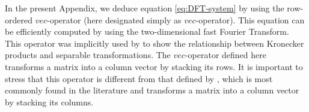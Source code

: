 \documentclass[manuscript,revised]{geophysics}
\begin{document}
%




In the present Appendix, we deduce equation \ref{eq:DFT-system}
by using the row-ordered $vec$-operator (here designated simply as $vec$-operator).
This equation can be efficiently computed by using the two-dimensional 
fast Fourier Transform. 
This operator was implicitly used by \citet[][ p. 31]{jain1989} to 
show the relationship between Kronecker products and separable 
transformations. The $vec$-operator defined here 
transforms a matrix into a column vector by stacking its rows. It is important 
to stress that this operator is different from that defined by \citet{neudecker1969}, which 
is most commonly found in the literature and 
transforms a matrix into a column vector by stacking its columns.
\end{document}
